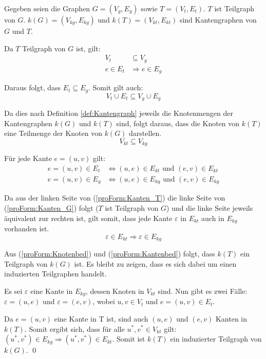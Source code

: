 \begin{myProof}
Gegeben seien die Graphen $G=(V_g,E_g)$ sowie $T=(V_t,E_t)$. $T$ ist 
Teilgraph von $G$. $k(G)=(V_{kg},E_{kg})$ und $k(T)=(V_{kt},E_{kt})$ 
sind Kantengraphen von $G$ und $T$. 

Da $T$ Teilgraph von $G$ ist, gilt:
\begin{align*}
V_t &\subseteq V_g \\%
e \in E_t &\Rightarrow e \in E_g %
\end{align*}

Daraus folgt, dass $E_t \subseteq E_g$. Somit 
gilt auch:
\[ V_t \cup E_t \subseteq V_g \cup E_g \]

Da dies nach Definition \ref{def:Kantengraph} jeweils die Knotenmengen 
der Kantengraphen $k(G)$ und $k(T)$ sind, folgt daraus, dass die Knoten 
von $k(T)$ eine Teilmenge der Knoten von $k(G)$ darstellen.
\begin{equation}
V_{kt} \subseteq V_{kg} \label{proForm:Knotenbed}
\end{equation}

Für jede Kante $e=(u,v)$ gilt:
\begin{align}
e=(u,v) \in E_t &\Leftrightarrow (u,e) \in E_{kt} \text{ und } 
  (e,v) \in E_{kt} \label{proForm:Kanten_T} \\
e=(u,v) \in E_g &\Leftrightarrow (u,e) \in E_{kg} \text{ und } 
  (e,v) \in E_{kg} \label{proForm:Kanten_G}
\end{align}

Da aus der linken Seite von (\ref{proForm:Kanten_T}) die linke Seite 
von (\ref{proForm:Kanten_G}) folgt ($T$ ist Teilgraph von $G$) und die 
linke Seite jeweils äquivalent zur rechten ist, gilt somit, dass jede 
Kante $\varepsilon$ in $E_{kt}$ auch in $E_{kg}$ vorhanden ist.
\begin{equation}
\varepsilon \in E_{kt} \Rightarrow \varepsilon \in E_{kg} \label{proForm:Kantenbed}
\end{equation}

Aus (\ref{proForm:Knotenbed}) und (\ref{proForm:Kantenbed}) folgt, dass 
$k(T)$ ein Teilgraph von $k(G)$ ist. Es bleibt zu zeigen, dass es 
sich dabei um einen induzierten Teilgraphen handelt.

Es sei $\varepsilon$ eine Kante in $E_{kg}$, dessen Knoten in $V_{kt}$ sind. 
Nun gibt es zwei Fälle: $\varepsilon=(u,e)$ und $\varepsilon=(e,v)$, wobei 
$u,v \in V_t$ und $e=(u,v) \in E_t$.

Da $e=(u,v)$ eine Kante in T ist, sind auch $(u,e)$ und 
$(e,v)$ Kanten in $k(T)$. 
Somit ergibt sich, dass für alle $u^{*},v^{*} \in V_{kt}$ gilt: 
$(u^{*},v^{*}) \in E_{kg} \Rightarrow (u^{*},v^{*}) \in E_{kt}$. 
Somit ist $k(T)$ ein induzierter Teilgraph von $k(G)$. \qed
\end{myProof}

